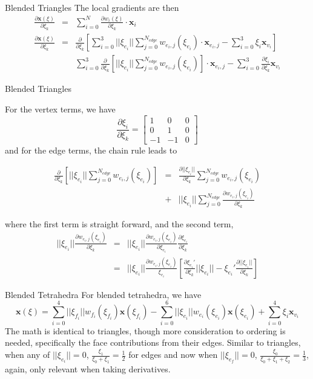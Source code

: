 \documentclass[12pt]{beamer}
\begin{document}
\begin{frame}{Blended Triangles}
The local gradients are then
\begin{eqnarray*}\frac{\partial \mathbf{x}(\xi)}{\partial \xi_k}& = & \sum_{i=0}^N \frac{\partial w_i(\xi)}{\partial \xi_k} \cdot \mathbf{x}_i \\
\frac{\partial \mathbf{x}(\xi)}{\partial \xi_k}& = & \frac{\partial}{\partial \xi_k}\left[\sum_{i=0}^{3}||\xi_{e_i}||\sum_{j=0}^{N_{edge}}w_{e_i,j}(\xi_{e_i})\cdot\mathbf{x}_{e_i,j}- \sum_{i=0}^{3}\xi_i\mathbf{x}_{v_i}\right] \\ & & 
\sum_{i=0}^{3}\frac{\partial}{\partial \xi_k}\left[||\xi_{e_i}||\sum_{j=0}^{N_{edge}}w_{e_i,j}(\xi_{e_i})\right]\cdot\mathbf{x}_{e_i,j}- \sum_{i=0}^{3} \frac{\partial \xi_i}{\partial \xi_k}\mathbf{x}_{v_i}\end{eqnarray*}
\end{frame}
\begin{frame}{Blended Triangles}
{
  \footnotesize
For the vertex terms, we have
\[ \frac{\partial \xi_i}{\partial \xi_k} = \left[ \begin{array}{ccc} 1 & 0 & 0 \\ 0 & 1 & 0 \\ -1 & -1 & 0 \end{array}\right]\]
and for the edge terms, the chain rule leads to


\begin{eqnarray*}
\frac{\partial}{\partial \xi_k}\left[||\xi_{e_i}||\sum_{j=0}^{N_{edge}}w_{e_i,j}(\xi_{e_i})\right] & = & \frac{\partial ||\xi_{e_i}||}{\partial \xi_k}\sum_{j=0}^{N_{edge}}w_{e_i,j}(\xi_{e_i}) \\ & + & ||\xi_{e_i}||\sum_{j=0}^{N_{edge}}\frac{\partial w_{e_i,j}(\xi_{e_i})}{\partial \xi_k}
\end{eqnarray*}

where the first term is straight forward, and the second term, 
\begin{eqnarray*}
||\xi_{e_i}||\frac{\partial w_{e_i,j}(\xi_{e_i})}{\partial \xi_k} & = &
||\xi_{e_i}||\frac{\partial w_{e_i,j}(\xi_{e_i})}{\partial \xi_{e_i}}\frac{\partial \xi_{e_i}}{\partial \xi_k} 
\\ & = & 
||\xi_{e_i}||\frac{\partial w_{e_i,j}(\xi_{e_i})}{\xi_{e_i}}\left[\frac{\partial \xi_{e_i}'}{\partial \xi_k}||\xi_{e_i}||-\xi_{e_i}'\frac{\partial ||\xi_{e_i}||}{\partial \xi_k} \right]
\end{eqnarray*}
}
\end{frame}
\begin{frame}{Blended Tetrahedra}
For blended tetrahedra, we have
\[\mathbf{x}(\xi) = \sum_{i=0}^{4}||\xi_{f_i}||w_{f_i}(\xi_{f_i})\mathbf{x}(\xi_{f_i}) - \sum_{i=0}^{6}||\xi_{e_i}||w_{e_i}(\xi_{e_i})\mathbf{x}(\xi_{e_i}) + \sum_{i=0}^{4}\xi_i\mathbf{x}_{v_i}\]
The math is identical to triangles, though more consideration to ordering is needed, specifically the face contributions from their edges.
Similar to triangles, when any of $||\xi_{e_i}|| = 0$, $\frac{\xi_1}{\xi_0+\xi_1} = \frac{1}{2}$ for edges and now when $||\xi_{e_f}|| = 0$, $\frac{\xi_0}{\xi_0+\xi_1+\xi_2} = \frac{1}{3}$, again, only relevant when taking derivatives.
\end{frame}
\end{document}
